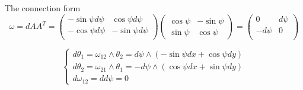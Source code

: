 \documentclass[12pt]{article}
\begin{document}
The connection form $$
 \omega = dA A^T = \begin{pmatrix}
 	-\sin\psi d\psi& \cos\psi d\psi \\
 	-\cos\psi d\psi & -\sin\psi d\psi \\
 \end{pmatrix}
\begin{pmatrix}
	\cos\psi & -\sin\psi \\
	\sin\psi & \cos\psi 
\end{pmatrix}
= 
\begin{pmatrix}
	0 &  d\psi \\
	-d\psi & 0  \\
\end{pmatrix}
$$

$$\begin{cases}
	d\theta_1 = \omega_{12}\wedge \theta_2 = d\psi \wedge (-\sin\psi dx + \cos\psi dy) \\
	d\theta_2 = \omega_{21}\wedge \theta_1 = -d\psi \wedge(\cos\psi dx + \sin\psi dy) \\
	d\omega_{12} = dd\psi = 0
\end{cases}$$
\end{document}
